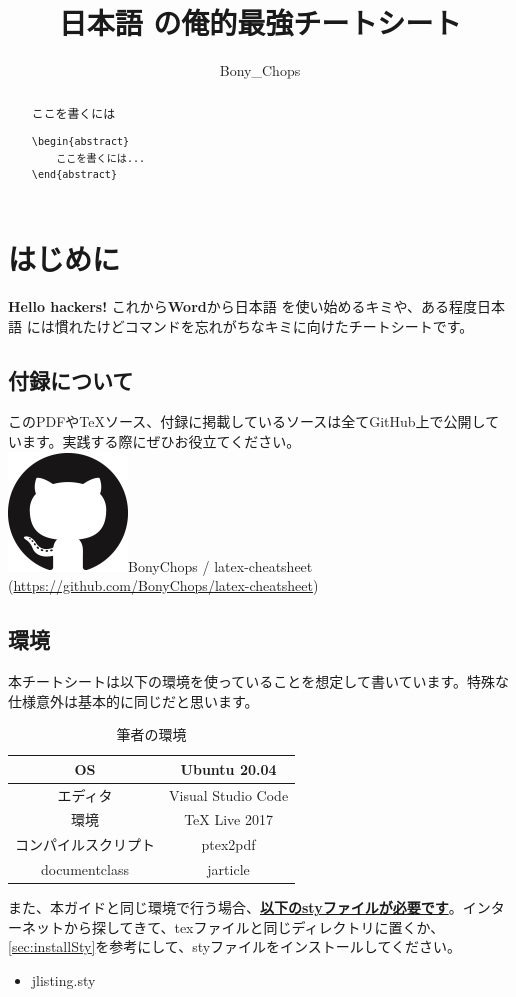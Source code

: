 \documentclass[a4j, titlepage]{jarticle}
\title{日本語 の俺的最強チートシート}
\author{Bony\_Chops}
\newcommand{\GitHub}{\includegraphics[scale=0.07]{image/github.png}}
\begin{document}
\maketitle
\begin{abstract}
    ここを書くには
    \begin{lstlisting}
\begin{abstract}
    ここを書くには...
\end{abstract}
    \end{lstlisting}
\end{abstract}

\setcounter{section}{-1}
\section{はじめに}
\textbf{Hello hackers!} これから\textbf{Word}から日本語 を使い始めるキミや、ある程度日本語 には慣れたけどコマンドを忘れがちなキミに向けたチートシートです。
\subsection{付録について}
このPDFや\TeX ソース、付録に掲載しているソースは全てGitHub上で公開しています。実践する際にぜひお役立てください。\\
\GitHub BonyChops / latex-cheatsheet (\url{https://github.com/BonyChops/latex-cheatsheet})
\subsection{環境}
本チートシートは以下の環境を使っていることを想定して書いています。特殊な仕様意外は基本的に同じだと思います。

\begin{table}[htbp]
    \center
    \caption{筆者の環境}
    \begin{tabular}{|c|c|} \hline
        OS & Ubuntu 20.04 \\ \hline
        エディタ & Visual Studio Code \\ \hline
        環境 & TeX Live 2017 \\ \hline
        コンパイルスクリプト & ptex2pdf \\ \hline
        documentclass & jarticle \\ \hline
    \end{tabular}
\end{table}

また、本ガイドと同じ環境で行う場合、\textbf{\underline{以下のstyファイルが必要です}}。インターネットから探してきて、texファイルと同じディレクトリに置くか、\ref{sec:installSty}を参考にして、styファイルをインストールしてください。
\begin{itemize}
    \item jlisting.sty
\end{itemize}
\end{document}

